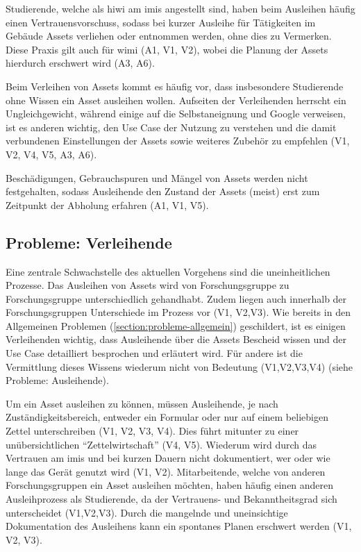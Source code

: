 Studierende, welche als \ac{hiwi} am \ac{imis} angestellt sind, haben beim
Ausleihen häufig einen Vertrauensvorschuss, sodass bei kurzer Ausleihe für
Tätigkeiten im Gebäude Assets verliehen oder entnommen werden, ohne dies zu
Vermerken. Diese Praxis gilt auch für \ac{wimi} (A1, V1, V2), wobei die Planung
der Assets hierdurch erschwert wird (A3, A6).

Beim Verleihen von Assets kommt es häufig vor, dass insbesondere Studierende
ohne Wissen  ein Asset ausleihen
wollen. Aufseiten der Verleihenden herrscht ein Ungleichgewicht, während
einige auf die Selbstaneignung und Google verweisen, ist es anderen
wichtig, den Use Case der Nutzung zu verstehen und die damit verbundenen
Einstellungen der Assets sowie weiteres Zubehör zu empfehlen (V1, V2,
V4, V5, A3, A6).

Beschädigungen, Gebrauchspuren und Mängel von Assets werden nicht festgehalten,
sodass Ausleihende den Zustand der Assets (meist) erst zum Zeitpunkt der
Abholung erfahren (A1, V1, V5).

\subsection{Probleme: Verleihende}
\label{section:probleme-verleihende}
Eine zentrale Schwachstelle des aktuellen Vorgehens sind die uneinheitlichen
Prozesse. Das Ausleihen von Assets wird von Forschungsgruppe zu Forschungsgruppe
unterschiedlich gehandhabt. Zudem liegen auch innerhalb der Forschungsgruppen
Unterschiede im Prozess vor (V1, V2,V3). Wie bereits in den Allgemeinen
Problemen (\ref{section:probleme-allgemein}) geschildert, ist es einigen
Verleihenden wichtig, dass Ausleihende über die Assets Bescheid wissen und der
Use Case detailliert besprochen und erläutert wird. Für andere ist die
Vermittlung dieses Wissens wiederum nicht von Bedeutung (V1,V2,V3,V4) (siehe
Probleme: Ausleihende).

Um ein Asset ausleihen zu können, müssen Ausleihende, je nach
Zuständigkeitsbereich, entweder ein Formular oder nur auf einem beliebigen
Zettel unterschreiben (V1, V2, V3, V4). Dies führt mitunter zu einer
unübersichtlichen \enquote{Zettelwirtschaft} (V4, V5). Wiederum wird durch das Vertrauen
am \ac{imis} und bei kurzen Dauern nicht dokumentiert, wer oder wie lange das
Gerät genutzt wird (V1, V2). Mitarbeitende, welche von anderen Forschungsgruppen
ein Asset ausleihen möchten, haben häufig einen anderen Ausleihprozess als
Studierende, da der Vertrauens- und Bekanntheitsgrad sich unterscheidet
(V1,V2,V3). Durch die mangelnde und uneinsichtige Dokumentation des Ausleihens
kann ein spontanes Planen erschwert werden (V1, V2, V3).

